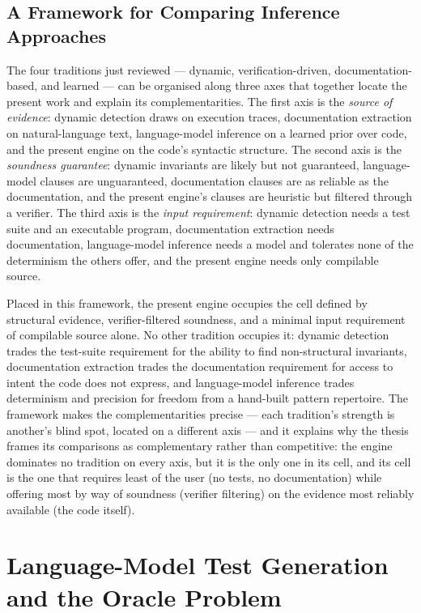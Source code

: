 \subsection{A Framework for Comparing Inference Approaches}

The four traditions just reviewed --- dynamic, verification-driven,
documentation-based, and learned --- can be organised along three axes that
together locate the present work and explain its complementarities. The first axis
is the \emph{source of evidence}: dynamic detection draws on execution traces,
documentation extraction on natural-language text, language-model inference on a
learned prior over code, and the present engine on the code's syntactic structure.
The second axis is the \emph{soundness guarantee}: dynamic invariants are likely
but not guaranteed, language-model clauses are unguaranteed, documentation clauses
are as reliable as the documentation, and the present engine's clauses are
heuristic but filtered through a verifier. The third axis is the \emph{input
requirement}: dynamic detection needs a test suite and an executable program,
documentation extraction needs documentation, language-model inference needs a
model and tolerates none of the determinism the others offer, and the present
engine needs only compilable source.

Placed in this framework, the present engine occupies the cell defined by
structural evidence, verifier-filtered soundness, and a minimal input requirement
of compilable source alone. No other tradition occupies it: dynamic detection
trades the test-suite requirement for the ability to find non-structural
invariants, documentation extraction trades the documentation requirement for
access to intent the code does not express, and language-model inference trades
determinism and precision for freedom from a hand-built pattern repertoire. The
framework makes the complementarities precise --- each tradition's strength is
another's blind spot, located on a different axis --- and it explains why the
thesis frames its comparisons as complementary rather than competitive: the engine
dominates no tradition on every axis, but it is the only one in its cell, and its
cell is the one that requires least of the user (no tests, no documentation) while
offering most by way of soundness (verifier filtering) on the evidence most
reliably available (the code itself).

\section{Language-Model Test Generation and the Oracle Problem}
\label{sec:bg-llm}

